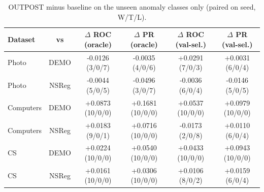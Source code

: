 \begin{table}[t]
\centering
\small
\begin{tabular}{lccccc}
\toprule
Dataset & vs & $\Delta$ ROC (oracle) & $\Delta$ PR (oracle) & $\Delta$ ROC (val-sel.) & $\Delta$ PR (val-sel.) \\
\midrule
Photo & DEMO & -0.0126 (3/0/7) & -0.0035 (4/0/6) & +0.0291 (7/0/3) & +0.0031 (6/0/4) \\
Photo & NSReg & -0.0044 (5/0/5) & -0.0496 (3/0/7) & -0.0036 (6/0/4) & -0.0146 (5/0/5) \\
Computers & DEMO & +0.0873 (10/0/0) & +0.1681 (10/0/0) & +0.0537 (10/0/0) & +0.0979 (10/0/0) \\
Computers & NSReg & +0.0183 (9/0/1) & +0.0716 (10/0/0) & -0.0173 (2/0/8) & +0.0110 (6/0/4) \\
CS & DEMO & +0.0224 (10/0/0) & +0.0540 (10/0/0) & +0.0433 (10/0/0) & +0.0943 (10/0/0) \\
CS & NSReg & +0.0161 (10/0/0) & +0.0306 (10/0/0) & +0.0106 (8/0/2) & +0.0159 (6/0/4) \\
\bottomrule
\end{tabular}
\caption{OUTPOST minus baseline on the unseen anomaly classes only (paired on seed, W/T/L).}
\label{tab:unseen}
\end{table}

